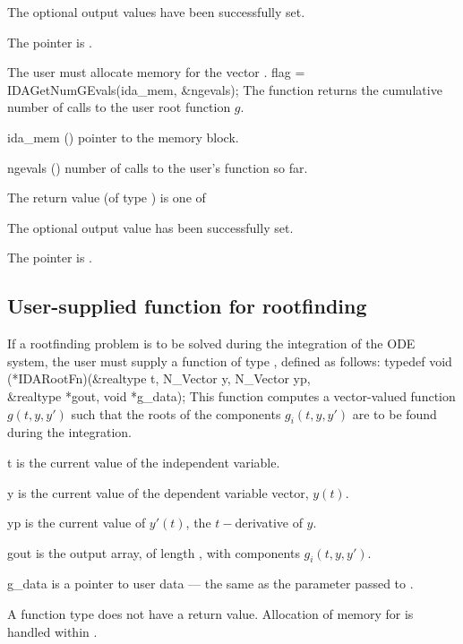 {{  \begin{args}
  \item[\Id{IDA\_SUCCESS}] 
    The optional output values have been successfully set.
  \item[\Id{IDA\_MEM\_NULL}]
    The  pointer is .
  \end{args}
}
{
  {\warn} The user must allocate memory for the vector .
}
{
  flag = IDAGetNumGEvals(ida\_mem, \&ngevals);
}
{
  The function  returns the cumulative
  number of calls to the user root function $g$.
}
{
  \begin{args}
  \item[ida\_mem] ()
    pointer to the {\ida} memory block.
  \item[ngevals] ()
    number of calls to the user's function  so far.
  \end{args}
}
{
  The return value  (of type ) is one of
  \begin{args}
  \item[\Id{IDA\_SUCCESS}] 
    The optional output value has been successfully set.
  \item[\Id{IDA\_MEM\_NULL}]
    The  pointer is .
  \end{args}
}
{}

\subsection{User-supplied function for rootfinding}\label{ss:root_us}

If a rootfinding problem is to be solved during the integration of the ODE system,
the user must supply a {\C} function of type , defined as follows:
{
  typedef void (*IDARootFn)(&realtype t, N\_Vector y, N\_Vector yp, \\
                           &realtype *gout, void *g\_data);
}
{
  This function computes a vector-valued function $g(t,y,y')$ such that the
  roots of the  components $g_i(t,y,y')$ are to be found during
  the integration.
}
{
  \begin{args}[g\_data]
  \item[t]
    is the current value of the independent variable.
  \item[y]
    is the current value of the dependent variable vector, $y(t)$.
  \item[yp]
    is the current value of $y'(t)$, the $t-$derivative of $y$.
  \item[gout]
    is the output array, of length , with components $g_i(t,y,y')$.
  \item[g\_data]
    is a pointer to user data --- the same as the       
    parameter passed to .   
  \end{args}
}
{
  A  function type does not have a return value.
}
{
  Allocation of memory for  is handled within {\ida}.
}

}
